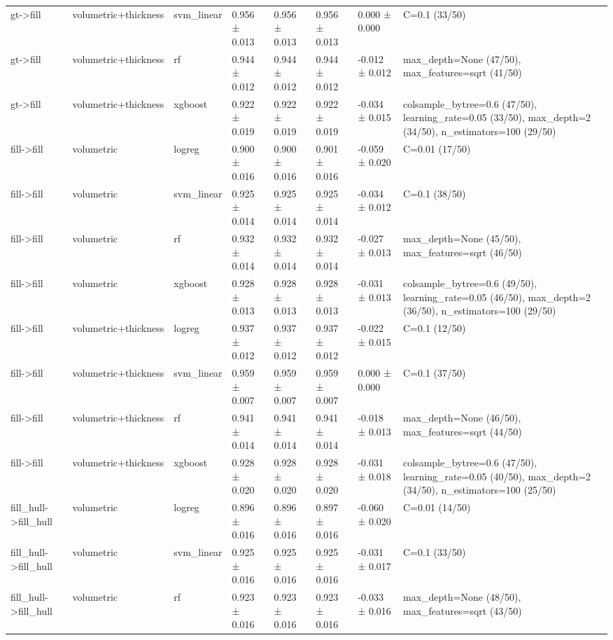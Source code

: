 \begin{tabular}{llllllll}
gt->fill & volumetric+thickness & svm\_linear & 0.956 ± 0.013 & 0.956 ± 0.013 & 0.956 ± 0.013 & 0.000 ± 0.000 & C=0.1 (33/50) \\
gt->fill & volumetric+thickness & rf & 0.944 ± 0.012 & 0.944 ± 0.012 & 0.944 ± 0.012 & -0.012 ± 0.012 & max\_depth=None (47/50), max\_features=sqrt (41/50) \\
gt->fill & volumetric+thickness & xgboost & 0.922 ± 0.019 & 0.922 ± 0.019 & 0.922 ± 0.019 & -0.034 ± 0.015 & colsample\_bytree=0.6 (47/50), learning\_rate=0.05 (33/50), max\_depth=2 (34/50), n\_estimators=100 (29/50) \\
fill->fill & volumetric & logreg & 0.900 ± 0.016 & 0.900 ± 0.016 & 0.901 ± 0.016 & -0.059 ± 0.020 & C=0.01 (17/50) \\
fill->fill & volumetric & svm\_linear & 0.925 ± 0.014 & 0.925 ± 0.014 & 0.925 ± 0.014 & -0.034 ± 0.012 & C=0.1 (38/50) \\
fill->fill & volumetric & rf & 0.932 ± 0.014 & 0.932 ± 0.014 & 0.932 ± 0.014 & -0.027 ± 0.013 & max\_depth=None (45/50), max\_features=sqrt (46/50) \\
fill->fill & volumetric & xgboost & 0.928 ± 0.013 & 0.928 ± 0.013 & 0.928 ± 0.013 & -0.031 ± 0.013 & colsample\_bytree=0.6 (49/50), learning\_rate=0.05 (46/50), max\_depth=2 (36/50), n\_estimators=100 (29/50) \\
fill->fill & volumetric+thickness & logreg & 0.937 ± 0.012 & 0.937 ± 0.012 & 0.937 ± 0.012 & -0.022 ± 0.015 & C=0.1 (12/50) \\
fill->fill & volumetric+thickness & svm\_linear & 0.959 ± 0.007 & 0.959 ± 0.007 & 0.959 ± 0.007 & 0.000 ± 0.000 & C=0.1 (37/50) \\
fill->fill & volumetric+thickness & rf & 0.941 ± 0.014 & 0.941 ± 0.014 & 0.941 ± 0.014 & -0.018 ± 0.013 & max\_depth=None (46/50), max\_features=sqrt (44/50) \\
fill->fill & volumetric+thickness & xgboost & 0.928 ± 0.020 & 0.928 ± 0.020 & 0.928 ± 0.020 & -0.031 ± 0.018 & colsample\_bytree=0.6 (47/50), learning\_rate=0.05 (40/50), max\_depth=2 (34/50), n\_estimators=100 (25/50) \\
fill\_hull->fill\_hull & volumetric & logreg & 0.896 ± 0.016 & 0.896 ± 0.016 & 0.897 ± 0.016 & -0.060 ± 0.020 & C=0.01 (14/50) \\
fill\_hull->fill\_hull & volumetric & svm\_linear & 0.925 ± 0.016 & 0.925 ± 0.016 & 0.925 ± 0.016 & -0.031 ± 0.017 & C=0.1 (33/50) \\
fill\_hull->fill\_hull & volumetric & rf & 0.923 ± 0.016 & 0.923 ± 0.016 & 0.923 ± 0.016 & -0.033 ± 0.016 & max\_depth=None (48/50), max\_features=sqrt (43/50) \\

\end{tabular}
